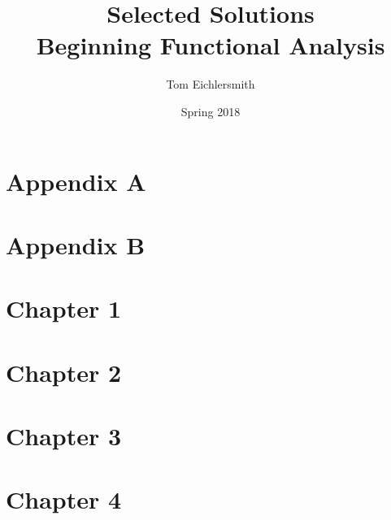 \documentclass{article}
\title{Selected Solutions \\ Beginning Functional Analysis}
\author{Tom Eichlersmith}
\date{Spring 2018}
\begin{document}
 
\maketitle
 
\section*{Appendix A}
 


\section*{Appendix B}



\section*{Chapter 1}



\section*{Chapter 2}



\section*{Chapter 3}



\section*{Chapter 4}


\end{document}
